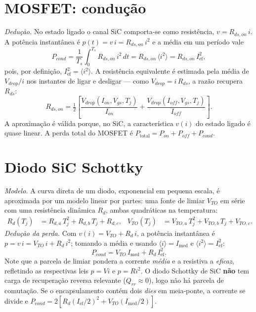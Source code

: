 \documentclass[
	a4paper, 12pt,
	chapter=TITLE, section=Title, subsection=Title,
	oneside, english, brazil, fleqn
]{abntex2}
\begin{document}
\section{MOSFET: condução}
\textit{Dedução.} No estado ligado o canal SiC comporta-se como resistência,
$v=R_{ds,on}\,i$. A potência instantânea é $p(t)=v\,i=R_{ds,on}\,i^2$ e a média em
um período vale
\begin{equation}
	P_{cond}=\frac{1}{T_s}\!\int_0^{T_s}\!R_{ds,on}\,i^2\,dt
	=R_{ds,on}\,\langle i^2\rangle=R_{ds,on}\,I_{\mathrm{ef}}^{2},
	\label{eq:pcondm}
\end{equation}
pois, por definição, $I_{\mathrm{ef}}^2=\langle i^2\rangle$. A resistência
equivalente é estimada pela média de $V_{drop}/i$ nos instantes de ligar e
desligar --- como $V_{drop}=i\,R_{ds}$, a razão recupera $R_{ds}$:
\begin{equation}
	R_{ds,on}=\tfrac12\!\left[\frac{V_{drop}(I_{on},V_{gs},T_j)}{I_{on}}
	+\frac{V_{drop}(I_{off},V_{gs},T_j)}{I_{off}}\right].
	\label{eq:rds}
\end{equation}
A aproximação é válida porque, no SiC, a característica $v(i)$ do estado ligado é
quase linear. A perda total do MOSFET é $P_{\mathrm{total}}=P_{on}+P_{off}+P_{cond}$.

\section{Diodo SiC Schottky}
\textit{Modelo.} A curva direta de um diodo, exponencial em pequena escala, é
aproximada por um modelo linear por partes: uma fonte de limiar $V_{TO}$ em série
com uma resistência dinâmica $R_d$, ambas quadráticas na temperatura:
\begin{align}
	R_d(T_j)  &= R_{d,a}\,T_j^{2}+R_{d,b}\,T_j+R_{d,c},&
	V_{TO}(T_j)&= V_{TO,a}\,T_j^{2}+V_{TO,b}\,T_j+V_{TO,c}.
	\label{eq:rdvto}
\end{align}
\textit{Dedução da perda.} Com $v(i)=V_{TO}+R_d\,i$, a potência instantânea é
$p=v\,i=V_{TO}\,i+R_d\,i^2$; tomando a média e usando
$\langle i\rangle=I_{\mathrm{med}}$ e $\langle i^2\rangle=I_{\mathrm{ef}}^2$:
\begin{equation}
	P_{cond}=V_{TO}\,I_{\mathrm{med}}+R_d\,I_{\mathrm{ef}}^{2}.
	\label{eq:pcondd}
\end{equation}
Note que a parcela de limiar pondera a corrente \emph{média} e a resistiva a
\emph{eficaz}, refletindo as respectivas leis $p=V i$ e $p=R i^2$. O diodo
Schottky de SiC \textbf{não} tem carga de recuperação reversa relevante
($Q_{rr}\approx0$), logo não há parcela de comutação. Se o encapsulamento contém
dois \emph{dies} em meia-ponte, a corrente se divide e
$P_{cond}=2[R_d(I_{\mathrm{ef}}/2)^2+V_{TO}(I_{\mathrm{med}}/2)]$.
\end{document}
